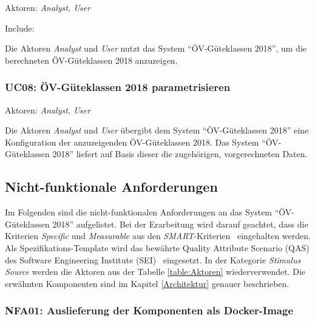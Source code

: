 Aktoren: \emph{Analyst, User}

Include: 

Die Aktoren \emph{Analyst} und \emph{User} nutzt das System "`\acs{ÖV}-Güteklassen 2018"', um die berechneten \acs{ÖV}-Güteklassen 2018 anzuzeigen.


\subsubsection{UC08: ÖV-Güteklassen 2018 parametrisieren}
\label{Use Cases:UC08}

Aktoren: \emph{Analyst, User}

Die Aktoren \emph{Analyst} und \emph{User} übergibt dem System "`\acs{ÖV}-Güteklassen 2018"' eine Konfiguration der anzuzeigenden \acs{ÖV}-Güteklassen 2018.
Das System "`\acs{ÖV}-Güteklassen 2018"' liefert auf Basis dieser die zugehörigen, vorgerechneten Daten.

\subsection{Nicht-funktionale Anforderungen}
\label{Anforderungsspezifikation:Nicht-funktionale Anforderungen}

Im Folgenden sind die nicht-funktionalen Anforderungen an das System "`\acs{ÖV}-Güteklassen 2018"' aufgelistet.
Bei der Erarbeitung wird darauf geachtet, dass die Kriterien \emph{Specific} und \emph{Measurable} aus den \emph{SMART}-Kriterien~\cite{SMART} eingehalten werden.
Als Spezifikations-Template wird das bewährte Quality Attribute Scenario (QAS) des Software Engineering Institute (SEI)~\cite{BassSoftwareArchitecture2012} eingesetzt.
In der Kategorie \emph{Stimulus Source} werden die Aktoren aus der Tabelle \ref{table:Aktoren} wiederverwendet.
Die erwähnten Komponenten sind im Kapitel \ref{Architektur} genauer beschrieben.

\subsubsection{NFA01: Auslieferung der Komponenten als Docker-Image}
\label{NFA:NFA01}

